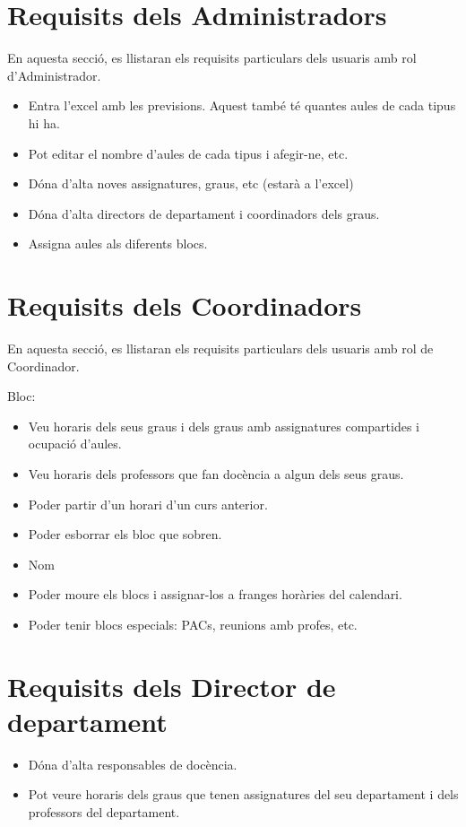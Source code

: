 \documentclass[a4paper,12pt]{ThesisStyle}
\begin{document}
\section{Requisits dels Administradors} %
\label{sec:requisits_administradors}

En aquesta secció, es llistaran els requisits particulars dels usuaris amb rol d'Administrador.

\begin{itemize}
  \item Entra l'excel amb les previsions. Aquest també té quantes aules de cada tipus hi ha.
  \item Pot editar el nombre d'aules de cada tipus i afegir-ne, etc.
  \item Dóna d'alta noves assignatures, graus, etc (estarà a l'excel)
  \item Dóna d'alta directors de departament i coordinadors dels graus.
  \item Assigna aules als diferents blocs.
\end{itemize}

\section{Requisits dels Coordinadors} %
\label{sec:requisits_coordinadors}

En aquesta secció, es llistaran els requisits particulars dels usuaris amb rol de Coordinador.

Bloc:

\begin{itemize} %
  \item Veu horaris dels seus graus i dels graus amb assignatures compartides i ocupació d'aules.
  \item Veu horaris dels professors que fan docència a algun dels seus graus.
  \item Poder partir d'un horari d'un curs anterior.
  \item Poder esborrar els bloc que sobren.
  \item Nom
  \item Poder moure els blocs i assignar-los a franges horàries del calendari.
  \item Poder tenir blocs especials: PACs, reunions amb profes, etc.
\end{itemize}

\section{Requisits dels Director de departament} %
\label{sec:requisits_director_departament}
\begin{itemize}
  \item Dóna d'alta responsables de docència.
  \item Pot veure horaris dels graus que tenen assignatures del seu departament i dels professors del departament.
\end{itemize}
\end{document}

